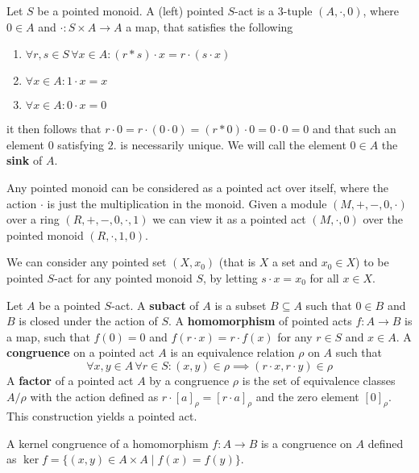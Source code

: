 \begin{definition}
    Let $S$ be a pointed monoid. A (left) pointed $S$-act is a $3$-tuple $(A,\cdot, 0)$, where $0\in A$ and $\cdot: S\times A \to A$ 
    a map, that satisfies the following
    \begin{enumerate}
        \item $\forall r,s\in S\, \forall x\in A : (r\ast s)\cdot x = r\cdot(s\cdot x)$
        \item $\forall x\in A : 1\cdot x = x$
        \item $\forall x\in A : 0\cdot x = 0$
    \end{enumerate}
    it then follows that $r\cdot 0 = r\cdot (0\cdot 0) = (r\ast 0)\cdot 0 = 0\cdot 0 = 0$ and that 
    such an element $0$ satisfying $2.$ is necessarily unique. We will call the element $0\in A$ the 
    \textbf{sink} of $A$.
\end{definition}
\begin{example}
    Any pointed monoid can be considered as a pointed act over itself, where the action $\cdot$ is just the multiplication in the monoid. 
    Given a module $(M,+,-,0,\cdot)$ over a ring $(R,+,-,0,\cdot,1)$ we can view it as a pointed act $(M,\cdot,0)$ over the pointed monoid $(R,\cdot,1,0)$.
\end{example}
\begin{example}
    We can consider any pointed set $(X,x_0)$ (that is $X$ a set and $x_0\in X$) to be pointed $S$-act for any pointed monoid $S$,
    by letting $s\cdot x = x_0$ for all $x\in X$.
\end{example}
\begin{definition}
    Let $A$ be a pointed $S$-act. A \textbf{subact} of $A$ is a subset $B\subseteq A$ such that $0\in B$ and $B$ is closed under the action of $S$. 
    A \textbf{homomorphism} of pointed acts $f: A\to B$ is a map, such that $f(0) = 0$ and $f(r\cdot x) = r\cdot f(x)$ for any $r\in S$ and $x\in A$.
    A \textbf{congruence} on a pointed act $A$ is an equivalence relation $\rho$ on $A$ such that 
    \[
        \forall x,y\in A \,\forall r \in S: (x,y)\in\rho \implies (r\cdot x, r\cdot y)\in\rho
    \]
    A \textbf{factor} of a pointed act $A$ by a congruence $\rho$ is the set of equivalence classes $A/\rho$ with the action defined as $r \cdot [a]_\rho = [r \cdot a]_\rho$ and the zero element $[0]_\rho$. 
    This construction yields a pointed act.
\end{definition}
\begin{example}
    A kernel congruence of a homomorphism $f: A\to B$ is a congruence on $A$ defined as $\ker{f} = \{(x,y)\in A\times A \mid f(x) = f(y)\}$.
\end{example}
